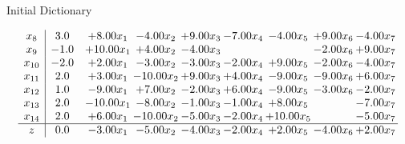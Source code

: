 \documentclass[8pt]{article}
\begin{document}
Initial Dictionary 

\[\begin{array}{c| c c@{\hskip 2pt} c@{\hskip 2pt} c@{\hskip 2pt} c@{\hskip 2pt} c@{\hskip 2pt} c@{\hskip 2pt} c@{\hskip 2pt} }
 x_{8}   &  3.0 & +  8.00 x_{1} & -4.00 x_{2} & +  9.00 x_{3} & -7.00 x_{4} & -4.00 x_{5} & +  9.00 x_{6} & -4.00 x_{7}\\
 x_{9}   &  -1.0 & + 10.00 x_{1} & +  4.00 x_{2} & -4.00 x_{3} &    &   & -2.00 x_{6} & +  9.00 x_{7}\\
 x_{10}   &  -2.0 & +  2.00 x_{1} & -3.00 x_{2} & -3.00 x_{3} & -2.00 x_{4} & +  9.00 x_{5} & -2.00 x_{6} & -4.00 x_{7}\\
 x_{11}   &  2.0 & +  3.00 x_{1} & -10.00 x_{2} & +  9.00 x_{3} & +  4.00 x_{4} & -9.00 x_{5} & -9.00 x_{6} & +  6.00 x_{7}\\
 x_{12}   &  1.0 & -9.00 x_{1} & +  7.00 x_{2} & -2.00 x_{3} & +  6.00 x_{4} & -9.00 x_{5} & -3.00 x_{6} & -2.00 x_{7}\\
 x_{13}   &  2.0 & -10.00 x_{1} & -8.00 x_{2} & -1.00 x_{3} & -1.00 x_{4} & +  8.00 x_{5} &   & -7.00 x_{7}\\
 x_{14}   &  2.0 & +  6.00 x_{1} & -10.00 x_{2} & -5.00 x_{3} & -2.00 x_{4} & + 10.00 x_{5} &   & -5.00 x_{7}\\
\hline
z    &  0.0 & -3.00 x_{1} & -5.00 x_{2} & -4.00 x_{3} & -2.00 x_{4} & +  2.00 x_{5} & -4.00 x_{6} & +  2.00 x_{7}\\
\end{array}\]
\end{document}
